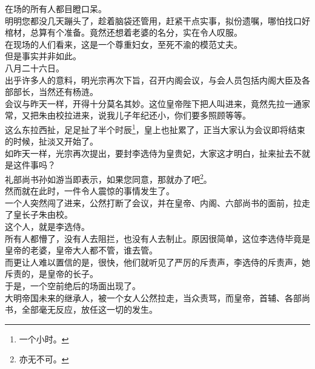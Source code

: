 \begin{multicols}{\theparacolNo}
在场的所有人都目瞪口呆。\\

明明您都没几天蹦头了，趁着脑袋还管用，赶紧干点实事，拟份遗嘱，哪怕找口好棺材，总算有个准备。竟然还想着老婆的名分，实在令人叹服。\\

在现场的人们看来，这是一个尊重妇女，至死不渝的模范丈夫。\\

但是事实并非如此。\\

八月二十六日。\\

出乎许多人的意料，明光宗再次下旨，召开内阁会议，与会人员包括内阁大臣及各部部长，当然还有杨涟。\\

会议与昨天一样，开得十分莫名其妙。这位皇帝陛下把人叫进来，竟然先拉一通家常，又把朱由校拉进来，说我儿子年纪还小，你们要多照顾等等。\\

这么东拉西扯，足足扯了半个时辰\footnote{一个小时。}，皇上也扯累了，正当大家认为会议即将结束的时候，扯淡又开始了。\\

如昨天一样，光宗再次提出，要封李选侍为皇贵妃，大家这才明白，扯来扯去不就是这件事吗？\\

礼部尚书孙如游当即表示，如果您同意，那就办了吧\footnote{亦无不可。}。\\

然而就在此时，一件令人震惊的事情发生了。\\

一个人突然闯了进来，公然打断了会议，并在皇帝、内阁、六部尚书的面前，拉走了皇长子朱由校。\\

这个人，就是李选侍。\\

所有人都懵了，没有人去阻拦，也没有人去制止。原因很简单，这位李选侍毕竟是皇帝的老婆，皇帝大人都不管，谁去管。\\

而更让人难以置信的是，很快，他们就听见了严厉的斥责声，李选侍的斥责声，她斥责的，是皇帝的长子。\\

于是，一个空前绝后的场面出现了。\\

大明帝国未来的继承人，被一个女人公然拉走，当众责骂，而皇帝，首辅、各部尚书，全部毫无反应，放任这一切的发生。\\


\end{multicols}
